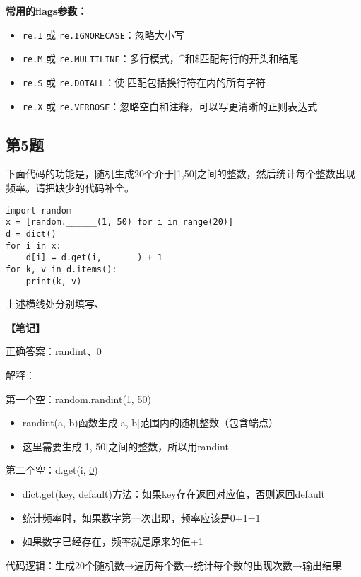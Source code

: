 \begin{mdframed}[linewidth=1pt, linecolor=black]
  \textbf{常用的flags参数：}
  \begin{itemize}
    \item \texttt{re.I} 或 \texttt{re.IGNORECASE}：忽略大小写
    \item \texttt{re.M} 或 \texttt{re.MULTILINE}：多行模式，\^{}和\$匹配每行的开头和结尾
    \item \texttt{re.S} 或 \texttt{re.DOTALL}：使.匹配包括换行符在内的所有字符
    \item \texttt{re.X} 或 \texttt{re.VERBOSE}：忽略空白和注释，可以写更清晰的正则表达式
  \end{itemize}

\end{mdframed}

\subsection{第5题}
下面代码的功能是，随机生成20个介于[1,50]之间的整数，然后统计每个整数出现频率。请把缺少的代码补全。
\begin{lstlisting}
import random
x = [random.______(1, 50) for i in range(20)]
d = dict()
for i in x:
    d[i] = d.get(i, ______) + 1
for k, v in d.items():
    print(k, v)
\end{lstlisting}
上述横线处分别填写\underline{\hspace{3cm}}、\underline{\hspace{3cm}}

\begin{mdframed}[linewidth=1pt, linecolor=black]

  \textbf{\color{red}【笔记】}

  正确答案：\underline{randint}、\underline{0}

  解释：

  \qquad 第一个空：random.\underline{randint}(1, 50)
  \begin{itemize}
    \item randint(a, b)函数生成[a, b]范围内的随机整数（包含端点）
    \item 这里需要生成[1, 50]之间的整数，所以用randint
  \end{itemize}

  \qquad 第二个空：d.get(i, \underline{0})
  \begin{itemize}
    \item dict.get(key, default)方法：如果key存在返回对应值，否则返回default
    \item 统计频率时，如果数字第一次出现，频率应该是0+1=1
    \item 如果数字已经存在，频率就是原来的值+1
  \end{itemize}

  \qquad 代码逻辑：生成20个随机数→遍历每个数→统计每个数的出现次数→输出结果

\end{mdframed}